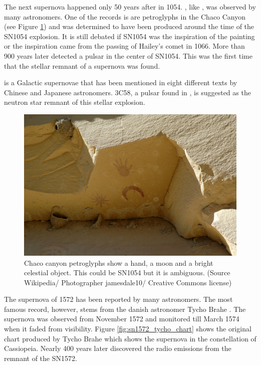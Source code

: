 The next supernova happened only 50 years after  in 1054. 
, like , was observed by many astronomers. One of the records is are petroglyphs in the Chaco Canyon (see Figure \ref{fig:sn1006_chaco}) and was determined to have been produced around the time of the SN1054 explosion. It is still debated if SN1054 was the inspiration of the painting or the inspiration came from the passing of Hailey's comet in 1066. 
More than 900 years later \cite{1968Sci...162.1481S} detected a pulsar in the center of SN1054. This was the first time that the stellar remnant of a supernova was found.

 is a Galactic supernovae that has been mentioned in eight different texts by Chinese and Japanese astronomers. 3C58, a pulsar found in , is suggested as the neutron star remnant of this stellar explosion. 



\begin{figure}[htbp] %
   \centering
   \includegraphics[width=\textwidth]{chapter_intro/plots/Chaco_canyon_pueblo_bonito_petroglyphs.jpg} 
   \caption{Chaco canyon petroglyphs show a hand, a moon and a bright celestial object. This could be SN1054 but it is ambiguous. (Source Wikipedia/ Photographer jamesdale10/ Creative Commons license)}
   \label{fig:sn1006_chaco}
\end{figure}


The supernova of 1572 has been reported by many astronomers. The most famous record, however, stems from the danish astronomer Tycho Brahe \citep{1602QB41.B73.......}. The supernova was observed from November 1572 and monitored till March 1574 when it faded from visibility. Figure \ref{fig:sn1572_tycho_chart} shows the original chart produced by Tycho Brahe which shows the supernova in the constellation of Cassiopeia. Nearly 400 years later \citet{1952Natur.170..364H} discovered the radio emissions from the remnant of the SN1572. 


